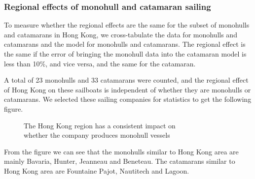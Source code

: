 \subsubsection{Regional effects of monohull and catamaran sailing}

To measure whether the regional effects are the same for the subset of monohulls and catamarans in Hong Kong, we cross-tabulate the data for monohulls and catamarans and the model for monohulls and catamarans. The regional effect is the same if the error of bringing the monohull data into the catamaran model is less than 10\%, and vice versa, and the same for the catamaran.

A total of 23 monohulls and 33 catamarans were counted, and the regional effect of Hong Kong on these sailboats is independent of whether they are monohulls or catamarans. We selected these sailing companies for statistics to get the following figure.

\vspace{-0.5cm}
\begin{figure}[H]
    \centering    
	\captionsetup{justification=centering} 
    \caption{The Hong Kong region has a consistent impact on \protect\\ whether the company produces monohull vessels} %
\end{figure}
\vspace{-0.5cm} %

From the figure we can see that the monohulls similar to Hong Kong area are mainly Bavaria, Hunter, Jeanneau and Beneteau. The catamarans similar to Hong Kong area are Fountaine Pajot, Nautitech and Lagoon.




